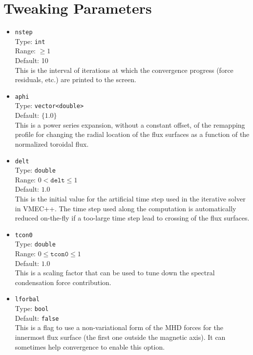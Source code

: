 \section{Tweaking Parameters}

\begin{itemize}

 \item \texttt{nstep} \\
       Type: \texttt{int} \\
       Range: $\geq 1$ \\
       Default: 10 \\
       This is the interval of iterations at which the convergence progress (force residuals, etc.) are printed to the screen.

 \item \texttt{aphi} \\
       Type: \texttt{vector<double>} \\
       Default: $\{ 1.0 \}$ \\
       This is a power series expansion, without a constant offset,
       of the remapping profile for changing the radial location of the flux surfaces
       as a function of the normalized toroidal flux.

 \item \texttt{delt} \\
       Type: \texttt{double} \\
       Range: $0 < \texttt{delt} \leq 1$ \\
       Default: $1.0$ \\
       This is the initial value for the artificial time step used in the iterative solver in VMEC++.
       The time step used along the computation is automatically reduced on-the-fly
       if a too-large time step lead to crossing of the flux surfaces.

 \item \texttt{tcon0} \\
       Type: \texttt{double} \\
       Range: $0 \leq \texttt{tcon0} \leq 1$ \\
       Default: $1.0$ \\
       This is a scaling factor that can be used to tune down the spectral condensation force contribution.

 \item \texttt{lforbal} \\
       Type: \texttt{bool} \\
       Default: \texttt{false} \\
       This is a flag to use a non-variational form of the MHD forces
       for the innermost flux surface (the first one outside the magnetic axis).
       It can sometimes help convergence to enable this option.

\end{itemize}

